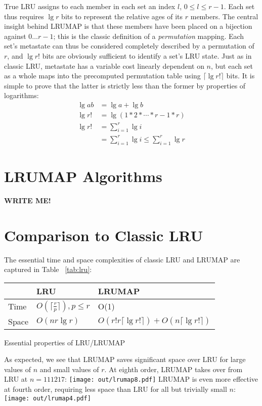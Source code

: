 \documentclass[letterpaper,10pt]{article}
\makeatletter
\newenvironment{tablehere}
{\def\@captype{table}}
{}
\newenvironment{figurehere}
{\def\@captype{figure}}
{}
\makeatother
\begin{document}
\begin{multicols}{2}
True LRU assigns to each member in each set an index $l$, $0\le{l}\le{r-1}$.
Each set thus requires $\lg{r}$ bits to represent the relative ages of its $r$
members. The central insight behind LRUMAP is that these members have been
placed on a bijection against $0\dotsc{r-1}$; this is the classic definition of
a \textit{permutation} mapping. Each set's metastate can thus be considered
completely described by a permutation of $r$, and $\lg{r!}$ bits are obviously
sufficient to identify a set's LRU state. Just as in classic LRU, metastate has
a variable cost linearly dependent on $n$, but each set as a whole maps into
the precomputed permutation table using $\lceil\lg{r!}\rceil$ bits. It is
simple to prove that the latter is strictly less than the former by properties
of logarithms:
\begin{align*}
\lg{ab} &= \lg{a} + \lg{b} \\
\lg{r!} &= \lg{(1*2*\dotsb*r-1*r)} \\
\lg{r!} &= \sum_{i=1}^{r}{\lg{i}} \\
&= \sum_{i=1}^{r}{\lg{i}} \le \sum_{i=1}^{r}{\lg{r}}
\end{align*}
\section{LRUMAP Algorithms}
\textbf{WRITE ME!}
\section{Comparison to Classic LRU}
The essential time and space complexities of classic LRU and LRUMAP are
captured in Table ~\ref{tab:lru}:
\begin{center}
\begin{tablehere}
	\begin{tabular}{|l|l|l|}
	\hline
	& LRU & LRUMAP \\
	\hline
	Time & $O(\lceil\frac{r}{p}\rceil), {p}\le{r}$ & O(1) \\
	\hline
	Space & $O(nr\lg{r})$ & $O(r!r\lceil\lg{r!}\rceil) + O(n\lceil\lg{r!}\rceil)$ \\
	\hline
	\end{tabular}
	\caption{Essential properties of LRU/LRUMAP}
	\label{tab:lru}
\end{tablehere}
\end{center}
As expected, we see that LRUMAP saves significant space over LRU for large
values of $n$ and small values of $r$. At eighth order, LRUMAP takes over
from LRU at $n=111217$:
\begin{figurehere}
	\centering
	\texttt{[image: out/lrumap8.pdf]}
\end{figurehere}
LRUMAP is even more effective at fourth order, requiring less space than LRU
for all but trivially small $n$:
\begin{figurehere}
	\centering
	\texttt{[image: out/lrumap4.pdf]}
\end{figurehere}

\end{multicols}
\end{document}
